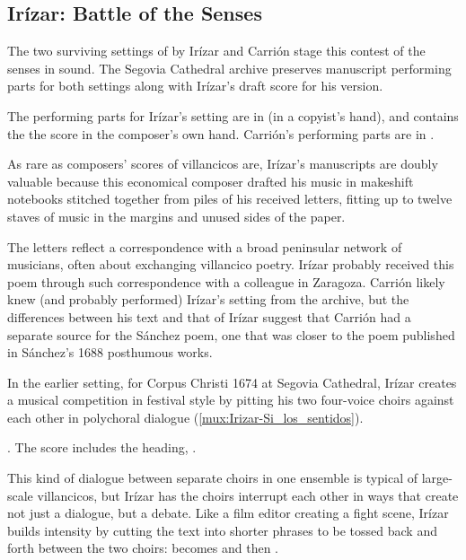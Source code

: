 \subsection{Irízar: Battle of the Senses}

The two surviving settings of  by Irízar and Carrión
stage this contest of the senses in sound.
The Segovia Cathedral archive preserves manuscript performing parts for both
settings along with Irízar's draft score for his version.%
\begin{Footnote}
    The performing parts for Irízar's setting are in  (in a
    copyist's hand), and  contains the the score in the
    composer's own hand.
    Carrión's performing parts are in .
\end{Footnote}
As rare as composers' scores of villancicos are, Irízar's manuscripts are doubly
valuable because this economical composer drafted his music in makeshift
notebooks stitched together from piles of his received letters, fitting up to
twelve staves of music in the margins and unused sides of the paper.%
    \Autocites{LopezCalo:IrizarLetters1}{Olarte:Irizar}

The letters reflect a correspondence with a broad peninsular network of
musicians, often about exchanging villancico poetry.%
    \Autocite{Rodriguez:Networks}
Irízar probably received this poem through such correspondence with a colleague
in Zaragoza.
Carrión likely knew (and probably performed) Irízar's setting from the archive,
but the differences between his text and that of Irízar suggest that Carrión had
a separate source for the Sánchez poem, one that was closer to the poem
published in Sánchez's 1688 posthumous works.%
    \Autocite[171--172]{Sanchez:LiraPoetica}

In the earlier setting, for Corpus Christi 1674 at Segovia Cathedral, Irízar
creates a musical competition in festival style by pitting his two four-voice
choirs against each other in polychoral dialogue
(\cref{mux:Irizar-Si_los_sentidos}).%
\begin{Footnote}
    \Autocite[133--148]{Cashner:WLSCM32}.  
    The score includes the heading, .
\end{Footnote}
This kind of dialogue between separate choirs in one ensemble is typical of
large-scale villancicos, but Irízar has the choirs interrupt each other in ways
that create not just a dialogue, but a debate.
Like a film editor creating a fight scene, Irízar builds intensity by cutting
the text into shorter phrases to be tossed back and forth between the two
choirs:  becomes  and then
.

